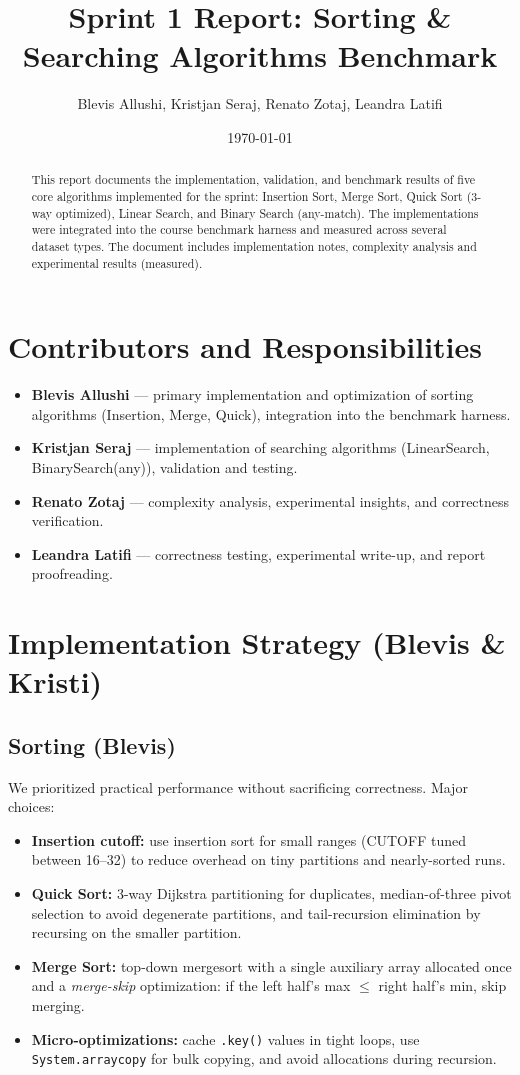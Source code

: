 \documentclass[11pt,a4paper]{article}
\title{Sprint 1 Report: Sorting \& Searching Algorithms Benchmark}
\author{Blevis Allushi, Kristjan Seraj, Renato Zotaj, Leandra Latifi}
\date{\today}
\begin{document}
\maketitle

\begin{abstract}
This report documents the implementation, validation, and benchmark results of five core algorithms implemented for the sprint: Insertion Sort, Merge Sort, Quick Sort (3-way optimized), Linear Search, and Binary Search (any-match). The implementations were integrated into the course benchmark harness and measured across several dataset types. The document includes implementation notes, complexity analysis and experimental results (measured).
\end{abstract}

\section{Contributors and Responsibilities}
\begin{itemize}
  \item \textbf{Blevis Allushi} --- primary implementation and optimization of sorting algorithms (Insertion, Merge, Quick), integration into the benchmark harness.
  \item \textbf{Kristjan Seraj} --- implementation of searching algorithms (LinearSearch, BinarySearch(any)), validation and testing.
  \item \textbf{Renato Zotaj} --- complexity analysis, experimental insights, and correctness verification.
  \item \textbf{Leandra Latifi} --- correctness testing, experimental write-up, and report proofreading.
\end{itemize}

\section{Implementation Strategy (Blevis \& Kristi)}
\subsection{Sorting (Blevis)}
We prioritized practical performance without sacrificing correctness. Major choices:
\begin{itemize}
  \item \textbf{Insertion cutoff:} use insertion sort for small ranges (CUTOFF tuned between 16--32) to reduce overhead on tiny partitions and nearly-sorted runs.
  \item \textbf{Quick Sort:} 3-way Dijkstra partitioning for duplicates, median-of-three pivot selection to avoid degenerate partitions, and tail-recursion elimination by recursing on the smaller partition.
  \item \textbf{Merge Sort:} top-down mergesort with a single auxiliary array allocated once and a \emph{merge-skip} optimization: if the left half's max $\le$ right half's min, skip merging.
  \item \textbf{Micro-optimizations:} cache \texttt{.key()} values in tight loops, use \texttt{System.arraycopy} for bulk copying, and avoid allocations during recursion.
\end{itemize}
\end{document}
